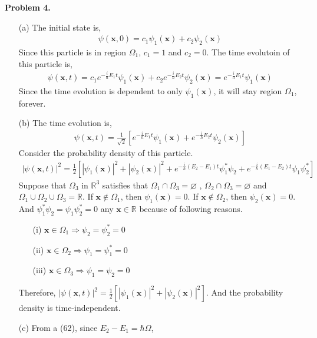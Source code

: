 \documentclass[aps,floatfix,nofootinbib,superscriptaddress,fleqn]{revtex4}
\begin{document}
  \noindent \textbf{Problem 4.}
  \begin{itemize}
    \item[(a)] The initial state is,
    \begin{align}
      \psi(\bm{x},0) = c_1\psi_1(\bm{x})+c_2\psi_2(\bm{x})
    \end{align} 
    Since this particle is in region $\Omega_1$, $c_1=1$ and $c_2=0$. The time evolutoin of this particle is,
    \begin{align}
      \psi(\bm{x},t) = c_1e^{-\frac{i}{\hbar}E_1t}\psi_1(\bm{x})+c_2e^{-\frac{i}{\hbar}E_2t}\psi_2(\bm{x}) = e^{-\frac{i}{\hbar}E_1t}\psi_1(\bm{x})
    \end{align}
    Since the time evolution is dependent to only $\psi_1(\bm{x})$, it will stay region $\Omega_1$, forever.
    \item[(b)]
    The time evolution is,
    \begin{align}
      \psi(\bm{x},t) = \frac{1}{\sqrt{2}}\left[ e^{-\frac{i}{\hbar}E_1t}\psi_1(\bm{x})+e^{-\frac{i}{\hbar}E_2t}\psi_2(\bm{x}) \right]
    \end{align}
    Consider the probability density of this particle.
    \begin{align}
      |\psi(\bm{x},t)|^2 = \frac{1}{2}\left[|\psi_1(\bm{x})|^2 + |\psi_2(\bm{x})|^2+e^{-\frac{i}{\hbar}(E_2-E_1)t}\psi_1^*\psi_2+e^{-\frac{i}{\hbar}(E_1-E_2)t}\psi_1\psi_2^*  \right]
    \end{align}
    Suppose that $\Omega_3$ in $\mathbb{R}^3 $ satisfies that $\Omega_1 \cap \Omega_3 = \varnothing$ , $\Omega_2 \cap \Omega_3 = \varnothing$ and $\Omega_1\cup \Omega_2\cup \Omega_3 = \mathbb{R}$.
    If $\bm{x}\notin\Omega_1$, then $\psi_1(\bm{x})=0$. If $\bm{x}\notin\Omega_2$, then $\psi_2(\bm{x})=0$. And $\psi_1^*\psi_2=\psi_1\psi_2^*=0$ any $\bm{x}\in \mathbb{R}$ because of following reasons.
    \begin{itemize}
      \item[(i)] $\bm{x}\in\Omega_1 \Longrightarrow \psi_2 = \psi^*_2 = 0$
      \item[(ii)] $\bm{x}\in\Omega_2 \Longrightarrow \psi_1 = \psi^*_1 = 0$
      \item[(iii)] $\bm{x}\in\Omega_3 \Longrightarrow \psi_1 = \psi_2 = 0$
    \end{itemize}
    Therefore, $|\psi(\bm{x},t)|^2 = \frac{1}{2}\left[ |\psi_1(\bm{x})|^2+|\psi_2(\bm{x})|^2 \right]$. And the probability density is time-independent.
    \item[(c)] From a (62), since $E_2-E_1=\hbar \Omega$,

\end{itemize}
\end{document}
